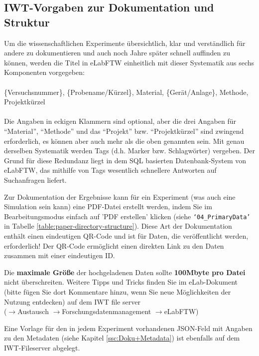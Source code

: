 \subsection{IWT-Vorgaben zur Dokumentation und Struktur}

Um die wissenschaftlichen Experimente übersichtlich, klar und verständlich für andere zu dokumentieren und auch noch Jahre später schnell auffinden zu können, werden die Titel in eLabFTW einheitlich mit dieser Systematik aus sechs Komponenten vorgegeben: \\
 \\
\{Versuchsnummer\}, \{Probename/Kürzel\}, Material, \{Gerät/Anlage\}, Methode, Projektkürzel \\
 \\
Die Angaben in eckigen Klammern sind optional, aber die drei Angaben für ``Material'', ``Methode'' und das ``Projekt'' bzw. ``Projektkürzel'' sind zwingend erforderlich, es können aber auch mehr als die oben genannten sein. Mit genau derselben Systematik werden Tags (d.h. Marker bzw. Schlagwörter) vergeben. Der Grund für diese Redundanz liegt in dem SQL basierten Datenbank-System von eLabFTW, das mithilfe von Tags wesentlich schnellere Antworten auf Suchanfragen liefert.

Zur Dokumentation der Ergebnisse kann für ein Experiment (was auch eine Simulation sein kann) eine PDF-Datei erstellt werden, indem Sie im Bearbeitungsmodus einfach auf 'PDF erstellen' klicken (siehe
\texttt{‘04\_PrimaryData’} in Tabelle \ref{table:paper-directory-structure}).
Diese Art der Dokumentation enthält einen eindeutigen QR-Code und ist für Daten, die veröffentlicht werden, erforderlich! Der QR-Code ermöglicht einen direkten Link zu den Daten zusammen mit einer eindeutigen ID.

Die \textbf{maximale Größe} der hochgeladenen Daten sollte \textbf{100Mbyte pro Datei} nicht überschreiten. Weitere Tipps und Tricks finden Sie im eLab-Dokument (bitte fügen Sie dort Kommentare hinzu, wenn Sie neue Möglichkeiten der Nutzung entdecken) auf dem IWT file server   \\ ($\rightarrow$Austausch $\rightarrow$Forschungsdatenmanagement $\rightarrow$eLabFTW)

Eine Vorlage für den in jedem Experiment vorhandenen JSON-Feld mit Angaben zu den Metadaten (siehe Kapitel \ref{ssc:Doku+Metadata}) ist ebenfalls auf dem IWT-Fileserver abgelegt.

